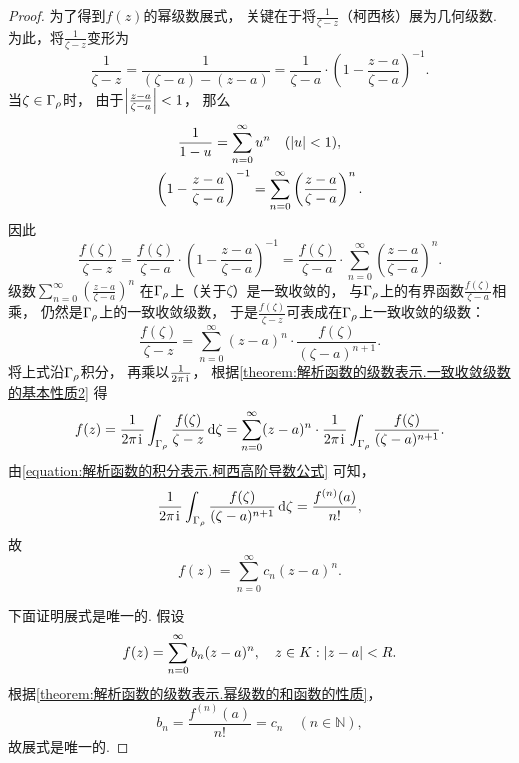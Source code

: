 \begin{theorem}
\begin{proof}
为了得到\(f(z)\)的幂级数展式，
关键在于将\(\frac1{\zeta-z}\)（柯西核）展为几何级数.
为此，将\(\frac1{\zeta-z}\)变形为\begin{equation*}
	\frac1{\zeta-z}
	= \frac1{(\zeta-a)-(z-a)}
	= \frac1{\zeta-a} \cdot \left(1 - \frac{z-a}{\zeta-a}\right)^{-1}.
\end{equation*}
当\(\zeta \in \Gamma_\rho\)时，
由于\(\abs{\frac{z-a}{\zeta-a}}<1\)，
那么\begin{gather*}
	\frac1{1-u} = \sum_{n=0}^\infty u^n
	\quad(\abs{u}<1), \\
	\left(1 - \frac{z-a}{\zeta-a}\right)^{-1}
	= \sum_{n=0}^\infty \left(\frac{z-a}{\zeta-a}\right)^n.
\end{gather*}
因此\begin{equation*}
	\frac{f(\zeta)}{\zeta-z}
	= \frac{f(\zeta)}{\zeta-a} \cdot \left(1 - \frac{z-a}{\zeta-a}\right)^{-1}
	= \frac{f(\zeta)}{\zeta-a} \cdot \sum_{n=0}^\infty \left(\frac{z-a}{\zeta-a}\right)^n.
\end{equation*}
级数\(\sum_{n=0}^\infty \left(\frac{z-a}{\zeta-a}\right)^n\)
在\(\Gamma_\rho\)上（关于\(\zeta\)）是一致收敛的，
与\(\Gamma_\rho\)上的有界函数\(\frac{f(\zeta)}{\zeta-a}\)相乘，
仍然是\(\Gamma_\rho\)上的一致收敛级数，
于是\(\frac{f(\zeta)}{\zeta-z}\)可表成在\(\Gamma_\rho\)上一致收敛的级数：\begin{equation*}
	\frac{f(\zeta)}{\zeta-z}
	= \sum_{n=0}^\infty (z-a)^n \cdot \frac{f(\zeta)}{(\zeta-a)^{n+1}}.
\end{equation*}
将上式沿\(\Gamma_\rho\)积分，
再乘以\(\frac1{2\pi\kern1pt\mathrm{i}\kern1pt}\)，
根据\cref{theorem:解析函数的级数表示.一致收敛级数的基本性质2} 得\begin{equation*}
	f(z) = \frac1{2\pi\kern1pt\mathrm{i}\kern1pt} \int_{\Gamma_\rho} \frac{f(\zeta)}{\zeta-z} \dd{\zeta}
	= \sum_{n=0}^\infty (z-a)^n \cdot \frac1{2\pi\kern1pt\mathrm{i}\kern1pt} \int_{\Gamma_\rho} \frac{f(\zeta)}{(\zeta-a)^{n+1}}.
\end{equation*}
由\cref{equation:解析函数的积分表示.柯西高阶导数公式} 可知，\begin{equation*}
	\frac1{2\pi\kern1pt\mathrm{i}\kern1pt} \int_{\Gamma_\rho} \frac{f(\zeta)}{(\zeta-a)^{n+1}} \dd{\zeta}
	= \frac{f^{(n)}(a)}{n!},
\end{equation*}
故\begin{equation*}
	f(z) = \sum_{n=0}^\infty c_n (z-a)^n.
\end{equation*}

下面证明展式是唯一的.
假设\begin{equation*}
	f(z) = \sum_{n=0}^\infty b_n (z-a)^n,
	\quad z \in K: \abs{z-a}<R.
\end{equation*}
根据\cref{theorem:解析函数的级数表示.幂级数的和函数的性质}，\begin{equation*}
	b_n = \frac{f^{(n)}(a)}{n!} = c_n \quad (n\in\mathbb{N}),
\end{equation*}
故展式是唯一的.
\end{proof}
\end{theorem}
